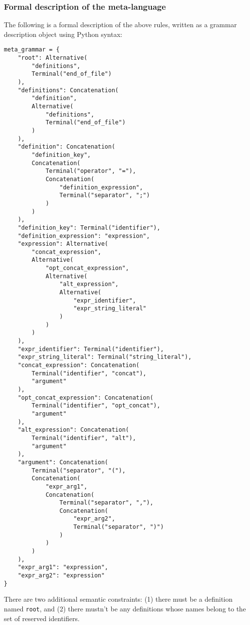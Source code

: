\documentclass{article}
\begin{document}
	\subsubsection{Formal description of the meta-language}

	The following is a formal description of the above rules, written as a
	grammar description object using Python syntax:

	\scriptsize\begin{verbatim}meta_grammar = {
    "root": Alternative(
        "definitions",
        Terminal("end_of_file")
    ),
    "definitions": Concatenation(
        "definition",
        Alternative(
            "definitions",
            Terminal("end_of_file")
        )
    ),
    "definition": Concatenation(
        "definition_key",
        Concatenation(
            Terminal("operator", "="),
            Concatenation(
                "definition_expression",
                Terminal("separator", ";")
            )
        )
    ),
    "definition_key": Terminal("identifier"),
    "definition_expression": "expression",
    "expression": Alternative(
        "concat_expression",
        Alternative(
            "opt_concat_expression",
            Alternative(
                "alt_expression",
                Alternative(
                    "expr_identifier",
                    "expr_string_literal"
                )
            )
        )
    ),
    "expr_identifier": Terminal("identifier"),
    "expr_string_literal": Terminal("string_literal"),
    "concat_expression": Concatenation(
        Terminal("identifier", "concat"),
        "argument"
    ),
    "opt_concat_expression": Concatenation(
        Terminal("identifier", "opt_concat"),
        "argument"
    ),
    "alt_expression": Concatenation(
        Terminal("identifier", "alt"),
        "argument"
    ),
    "argument": Concatenation(
        Terminal("separator", "("),
        Concatenation(
            "expr_arg1",
            Concatenation(
                Terminal("separator", ","),
                Concatenation(
                    "expr_arg2",
                    Terminal("separator", ")")
                )
            )
        )
    ),
    "expr_arg1": "expression",
    "expr_arg2": "expression"
}\end{verbatim}

	\normalsize There are two additional semantic constraints: (1) there must
	be a definition named \texttt{root}, and (2) there mustn't be any
	definitions whose names belong to the set of reserved identifiers.
\end{document}
